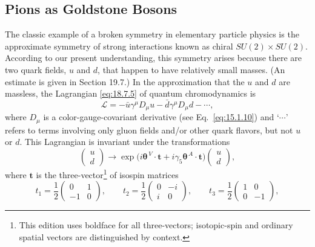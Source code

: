 
\subsection{Pions as Goldstone Bosons}
\label{sec:19.4}

The classic example of a broken symmetry in elementary particle physics is the approximate symmetry of strong interactions known as chiral $SU(2)\times SU(2)$. According to our present understanding, this symmetry arises because there are two quark fields, $u$ and $d$, that happen to have relatively small masses. (An estimate is given in Section 19.7.) In the approximation that the $u$ and $d$ are massless, the Lagrangian \eqref{eq:18.7.5} of quantum chromodynamics is
\begin{equation}
\mathcal L=-\bar u\gamma^\mu D_\mu u-\bar d\gamma^\mu D_\mu d-\cdots,
\tag{19.4.1}\label{eq:19.4.1}
\end{equation}
where $D_\mu$ is a color-gauge-covariant derivative (see Eq.~\eqref{eq:15.1.10}) and `$\cdots$' refers to terms involving only gluon fields and/or other quark flavors, but not $u$ or $d$. This Lagrangian is invariant under the transformations
\begin{equation}
\begin{pmatrix}u\\d\end{pmatrix}
\longrightarrow
\exp\bigl(i\boldsymbol{\theta}^{\,V}\cdot\mathbf{t}
+i\gamma_5\boldsymbol{\theta}^{\,A}\cdot\mathbf{t}\bigr)
\begin{pmatrix}u\\d\end{pmatrix},
\tag{19.4.2}\label{eq:19.4.2}
\end{equation}
where $\mathbf{t}$ is the three-vector\footnote{This edition uses boldface for
all three-vectors; isotopic-spin and ordinary spatial vectors are
distinguished by context.} of isospin matrices
\[
t_1=\frac12
\begin{pmatrix}0&1\\-1&0\end{pmatrix},
\qquad
t_2=\frac12
\begin{pmatrix}0&-i\\i&0\end{pmatrix},
\qquad
t_3=\frac12
\begin{pmatrix}1&0\\0&-1\end{pmatrix},
\]

